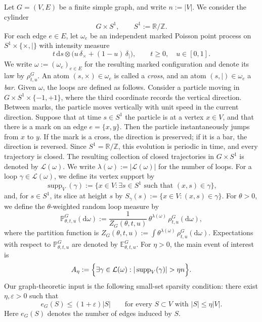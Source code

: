 \documentclass[11pt]{article}
\theoremstyle{remark}
\theoremstyle{plain}
\newcommand{\Pbb}{\mathbb{P}}
\newcommand{\Ebb}{\mathbb{E}}
\newcommand{\1}{\mathbbm{1}}
\newcommand{\dd}{\mathrm{d}}
\newcommand{\cL}{\mathcal{L}}
\begin{document}
Let \(G=(V,E)\) be a finite simple graph, and write \(n:=|V|\). We consider the cylinder
\[
G\times S^1,
\qquad S^1:=\mathbb R/\mathbb Z .
\]
For each edge \(e\in E\), let \(\omega_e\) be an independent marked Poisson point process on
\(S^1\times\{\times,\mid\}\) with intensity measure
\[
t\,\dd s\otimes\bigl(u\,\delta_{\times}+(1-u)\,\delta_{\mid}\bigr),
\qquad t\ge 0,\quad u\in[0,1].
\]
We write \(\omega:=(\omega_e)_{e\in E}\) for the resulting marked configuration and denote its law by
\(\rho^G_{t,u}\). An atom \((s,\times)\in\omega_e\) is called a \emph{cross}, and an atom
\((s,\mid)\in\omega_e\) a \emph{bar}.
Given \(\omega\), the loops are defined as follows. Consider a particle moving in
\(G\times S^1\times\{-1,+1\}\), where the third coordinate records the vertical direction.
Between marks, the particle moves vertically with unit speed in the current direction.
Suppose that at time \(s\in S^1\) the particle is at a vertex \(x\in V\), and that there is a mark
on an edge \(e=\{x,y\}\). Then the particle instantaneously jumps from \(x\) to \(y\). If the mark
is a cross, the direction is preserved; if it is a bar, the direction is reversed. Since
\(S^1=\mathbb R/\mathbb Z\), this evolution is periodic in time, and every trajectory is closed.
The resulting collection of closed trajectories in \(G\times S^1\) is denoted by \(\cL(\omega)\).
We write \(\lambda(\omega):=|\cL(\omega)|\) for the number of loops. For a loop
\(\gamma\in\cL(\omega)\), we define its vertex support by
\[
\operatorname{supp}_V(\gamma)
:=
\{x\in V:\exists s\in S^1\text{ such that }(x,s)\in\gamma\},
\]
and, for \(s\in S^1\), its slice at height \(s\) by $S_\gamma(s):=\{x\in V:(x,s)\in\gamma\}$.
For \(\theta>0\), we define the \(\theta\)-weighted random loop measure by
\[
\Pbb^G_{\theta,t,u}(\dd\omega)
:=
\frac{1}{Z_G(\theta,t,u)}\,\theta^{\lambda(\omega)}\,\rho^G_{t,u}(\dd\omega),
\]
where the partition function is $Z_G(\theta,t,u):=\int \theta^{\lambda(\omega)}\,\rho^G_{t,u}(\dd\omega)$.
Expectations with respect to \(\Pbb^G_{\theta,t,u}\) are denoted by
\(\Ebb^G_{\theta,t,u}\).
For \(\eta>0\), the main event of interest is
\[
A_\eta
:=
\Bigl\{\exists \gamma\in\cL(\omega): |\operatorname{supp}_V(\gamma)|>\eta n\Bigr\}.
\]
Our graph-theoretic input is the following small-set sparsity condition: there exist
\(\eta,\varepsilon>0\) such that
\begin{equation}
e_G(S)\le (1+\varepsilon)|S|
\qquad
\text{for every }S\subset V\text{ with }|S|\le \eta |V|.
\tag{A1}\label{eq:A1}
\end{equation}
Here \(e_G(S)\) denotes the number of edges induced by \(S\).
\end{document}
